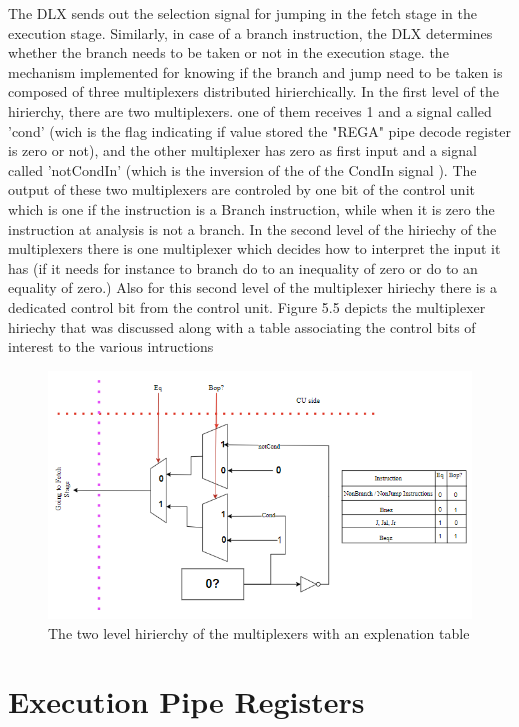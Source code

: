 The DLX sends out the selection signal for jumping in the fetch stage in the execution stage. Similarly, in case of a branch instruction,
the DLX determines whether the branch needs to be taken or not in the execution stage. the mechanism implemented for knowing if the branch and
jump need to be taken is composed of three multiplexers distributed hirierchically. In the first level of the hirierchy, there are two multiplexers.
one of them receives 1 and a signal called 'cond' (wich is the flag indicating if value stored the "REGA" pipe decode register is zero or not), and the other multiplexer has zero as first input 
and a signal called 'notCondIn' (which is the inversion of the of the CondIn signal ). The output of these two multiplexers are controled by one bit of the 
control unit which is one if the instruction is a Branch instruction, while when it is zero the instruction at analysis is not a branch. 
In the  second level of the hiriechy of the multiplexers there is one multiplexer which decides how to interpret the input it has (if it needs for instance
to branch do to an inequality of zero or do to an equality of zero.) Also for this second level of the multiplexer hiriechy there is a dedicated control bit from the  control unit.
Figure 5.5 depicts the multiplexer hiriechy that was discussed along with a table associating the control bits of interest to the various intructions

\begin{figure}[h!]
    \centering
    \includegraphics[scale = 0.8]
    {chapters/figures/BranchAndJumpDecision}
    \caption{The two level hirierchy of the multiplexers with an explenation table}
    \label{fig:BranchAndJumpDecision}
    \end{figure}

\section{ Execution Pipe Registers }

